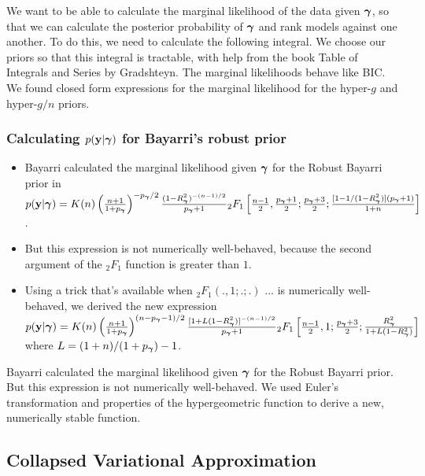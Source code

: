 We want to be able to calculate the marginal likelihood of the data given ${\boldsymbol \gamma}$, so that we can
calculate the posterior probability of ${\boldsymbol \gamma}$ and rank models against one another. To do this, we
need to calculate the following integral.
We choose our priors so that this integral is tractable, with help from the book Table of Integrals and
Series by Gradshteyn. The marginal likelihoods behave like BIC.
We found closed form expressions for the marginal likelihood for the hyper-$g$ and hyper-$g/n$ priors.

\subsubsection{Calculating $p({\bf y} | {\boldsymbol \gamma})$ for Bayarri's robust prior}
\begin{itemize}
	\item Bayarri calculated the marginal likelihood given ${\boldsymbol \gamma}$ for the Robust Bayarri prior
	 	in \cite{Bayarri2012} 
		\tiny
		$p({\bf y} | {\boldsymbol \gamma}) = K(n) \left(\frac{n + 1}{1 + p_{\boldsymbol \gamma}}\right)^{-p_{\boldsymbol \gamma}/2} \frac{(1 - R^2_{\boldsymbol \gamma})^{-(n-1)/2}}{p_{\boldsymbol \gamma} + 1} {}_2 F_1 \left[ \frac{n-1}{2}, \frac{p_{\boldsymbol \gamma}+1}{2}; \frac{p_{\boldsymbol \gamma} + 3}{2}; \frac{[1 - 1/(1 - R^2_{\boldsymbol \gamma})](p_{\boldsymbol \gamma} + 1)}{1 + n} \right]$.
	\small
	\item But this expression is not numerically well-behaved, because the second argument of the
				${}_2 F_1$ function is greater than $1$.
	\item Using a trick that's available when ${}_2 F_1(., 1; .; .)$ ... is numerically
				well-behaved, we derived the new expression
		\tiny
		$p({\bf y} | {\boldsymbol \gamma}) = K(n) \left(\frac{n + 1}{1 + p_{\boldsymbol \gamma}}\right)^{(n-p_{\boldsymbol \gamma}-1)/2} \frac{[1 + L (1 - R^2_{\boldsymbol \gamma})]^{-(n-1)/2}}{p_{\boldsymbol \gamma} + 1} {}_2 F_1 \left[ \frac{n-1}{2}, 1; \frac{p_{\boldsymbol \gamma} + 3}{2}; 
		\frac{R^2_{\boldsymbol \gamma}}{1 + L(1 - R^2_{\boldsymbol \gamma})} \right]$ \\
		\small
		where $L = (1 + n)/(1 + p_{\boldsymbol \gamma}) - 1$.
\end{itemize}

Bayarri calculated the marginal likelihood given ${\boldsymbol \gamma}$ for the Robust Bayarri prior.
But this expression is not numerically well-behaved.
We used Euler's transformation and properties of the hypergeometric function to derive a new,
numerically stable function.


\subsection{Collapsed Variational Approximation}


